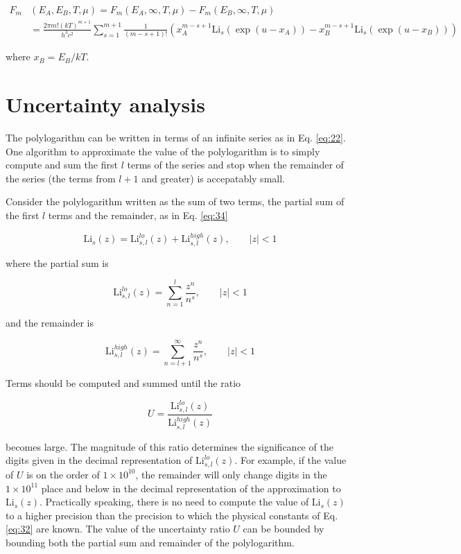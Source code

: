\documentclass[letterpaper,12pt]{article}
\newcommand{\Li}{\textrm{Li}}
\begin{document}
\begin{align} \label{eq:33}
F_{m}&(E_{A}, E_{B}, T, \mu) = F_{m}(E_{A}, \infty, T, \mu) - F_{m}(E_{B}, \infty, T, \mu) \nonumber \\
 &= \frac{2\pi m! (kT)^{m+1}}{h^{3} c^{2}} \sum_{s = 1}^{m+1} \frac{1}{(m-s+1)!} \left( x_{A}^{m-s+1} \Li_{s} \left( \exp(u-x_{A}) \right) - x_{B}^{m-s+1} \Li_{s} \left( \exp(u-x_{B}) \right)
\right)
\end{align}

\noindent where $x_{B} = E_{B}/kT$.


\section{Uncertainty analysis}
The polylogarithm can be written in terms of an infinite series as in Eq. \ref{eq:22}. One algorithm to approximate the value of the polylogarithm is to simply compute and sum the first $l$ terms of the series and stop when the remainder of the series (the terms from $l+1$ and greater) is accepatably small.

Consider the polylogarithm written as the sum of two terms, the partial sum of the first $l$ terms and the remainder, as in Eq. \ref{eq:34}

\begin{equation} \label{eq:34}
\Li_{s}(z) = \Li_{s,l}^{lo}(z) + \Li_{s,l}^{high}(z), \qquad |z| < 1
\end{equation}

\noindent where the partial sum is

\begin{equation} \label{eq:35}
\Li_{s,l}^{lo}(z) = \sum_{n = 1}^{l} \frac{z^{n}}{n^{s}}, \qquad |z| < 1
\end{equation}

\noindent and the remainder is

\begin{equation} \label{eq:36}
\Li_{s,l}^{high}(z) = \sum_{n = l + 1}^{\infty} \frac{z^{n}}{n^{s}}, \qquad |z| < 1
\end{equation}


Terms should be computed and summed until the ratio

\begin{equation} \label{eq:37}
U = \frac{\Li_{s,l}^{lo}(z)}{\Li_{s,l}^{high}(z)}
\end{equation}

\noindent becomes large. The magnitude of this ratio determines the significance of the digits given in the decimal representation of $\Li_{s,l}^{lo}(z)$. For example, if the value of $U$ is on the order of $1 \times 10^{10}$, the remainder will only change digits in the $1 \times 10^{11}$ place and below in the decimal representation of the approximation to $\Li_{s}(z)$. Practically speaking, there is no need to compute the value of $\Li_{s}(z)$ to a higher precision than the precision to which the physical constants of Eq. \ref{eq:32} are known. The value of the uncertainty ratio $U$ can be bounded by bounding both the partial sum and remainder of the polylogarithm.
\end{document}
